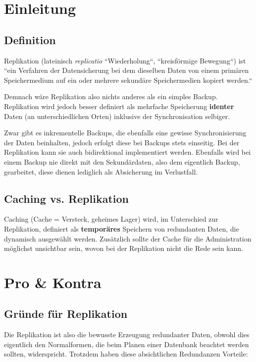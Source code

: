 
\section{Einleitung}
\subsection{Definition}
Replikation (lateinisch \textit{replicatio} \cite{duden} ``Wiederholung``, ``kreisförmige Bewegung``) \cite{dict} ist ``ein Verfahren der Datensicherung bei dem dieselben Daten von einem primären Speichermedium auf ein oder mehrere sekundäre Speichermedien kopiert werden.`` \cite{itw}

Demnach wäre Replikation also nichts anderes als ein simples Backup. Replikation wird jedoch besser definiert als mehrfache Speicherung \textbf{identer} Daten (an unterschiedlichen Orten) inklusive der Synchronisation selbiger. \cite{wiki}

Zwar gibt es inkrementelle Backups, die ebenfalls eine gewisse Synchronisierung der Daten beinhalten, jedoch erfolgt diese bei Backups stets einseitig. Bei der Replikation kann sie auch bidirektional implementiert werden. Ebenfalls wird bei einem Backup nie direkt mit den Sekundärdaten, also dem eigentlich Backup, gearbeitet, diese dienen lediglich als Absicherung im Verlustfall.

\subsection{Caching vs. Replikation}

Caching (Cache = Versteck, geheimes Lager) wird, im Unterschied zur Replikation, definiert als \textbf{temporäres} Speichern von redundanten Daten, die dynamisch ausgewählt werden. Zusätzlich sollte der Cache für die Administration möglichst unsichtbar sein, wovon bei der Replikation nicht die Rede sein kann. \cite{kaiserslautern}

\section{Pro \& Kontra}

\subsection{Gründe für Replikation}

Die Replikation ist also die bewusste Erzeugung redundanter Daten, obwohl dies eigentlich den Normalformen, die beim Planen einer Datenbank beachtet werden sollten, widerspricht. \cite{kaiserslautern} Trotzdem haben diese absichtlichen Redundanzen Vorteile:

